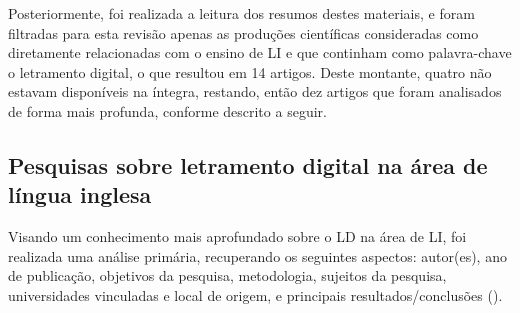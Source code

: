 Posteriormente, foi realizada a leitura dos resumos destes materiais, e
foram filtradas para esta revisão apenas as produções científicas
consideradas como diretamente relacionadas com o ensino de LI e que
continham como palavra-chave o letramento digital, o que resultou em 14
artigos. Deste montante, quatro não estavam disponíveis na íntegra,
restando, então dez artigos que foram analisados de forma mais profunda,
conforme descrito a seguir.

\subsection{Pesquisas sobre letramento digital na área de língua inglesa}\label{sub-sec-pesquisassobreletramentodigitalnaáreadelínguainglesa}

Visando um conhecimento mais aprofundado sobre o LD na área de LI, foi
realizada uma análise primária, recuperando os seguintes aspectos:
autor(es), ano de publicação, objetivos da pesquisa, metodologia,
sujeitos da pesquisa, universidades vinculadas e local de origem, e
principais resultados/conclusões ().

